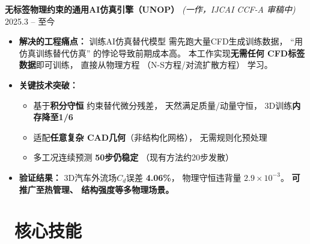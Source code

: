 \documentclass[11pt]{article}
\begin{document}
\textbf{无标签物理约束的通用AI仿真引擎（UNOP）} 
\textit{(一作，IJCAI CCF-A 审稿中)} 
\hfill 2025.3 -- 至今
\begin{itemize}
    \item \textbf{解决的工程痛点：}
    训练AI仿真替代模型
    需先跑大量CFD生成训练数据，
    ``用仿真训练替代仿真''
    的悖论导致前期成本高。
    本工作实现\textbf{无需任何
    CFD标签数据}即可训练，
    直接从物理方程
    （N-S方程/对流扩散方程）
    学习。
    
    \item \textbf{关键技术突破：}
    \begin{itemize}
        \item 基于\textbf{积分守恒}
        约束替代微分残差，
        天然满足质量/动量守恒，
        3D训练\textbf{内存降至1/6}
        \item 适配\textbf{任意复杂
        CAD几何}（非结构化网格），
        无需规则化预处理
        \item 多工况连续预测
        \textbf{50步仍稳定}
        （现有方法约20步发散）
    \end{itemize}
    
    \item \textbf{验证结果：}
    3D汽车外流场$C_d$误差
    \textbf{4.06\%}，
    物理守恒违背量
    $2.9\times10^{-3}$。
    \textbf{可推广至热管理、
    结构强度等多物理场景。}
\end{itemize}


\section{\makebox[\widthof{\faCogs}][c]
{\color{CVBlue}\faCogs}\ 核心技能}
    
\end{document}
